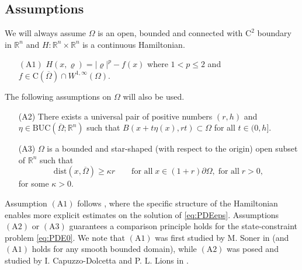 \documentclass[11pt,reqno]{amsart}
\numberwithin{figure}{section}
\theoremstyle{plain}
\theoremstyle{remark}
\numberwithin{equation}{section}
\begin{document}
\subsection{Assumptions} We will always assume $\Omega$ is an open, bounded and connected with $\mathrm{C}^2$ boundary in $\mathbb{R}^n$ and $H:\mathbb{R}^n\times \mathbb{R}^n$ is a continuous Hamiltonian. 
\begin{itemize}
    \item[$\mathrm{(A1)}$] $H(x,\varrho) = |\varrho|^p - f(x)$ where $1<p\leq 2$ and $f\in \mathrm{C}(\overline{\Omega})\cap W^{1,\infty}(\Omega)$.
\end{itemize}
    The following assumptions on $\Omega$ will also be used.
\begin{itemize}    
    \item[(A2)] There exists a universal pair of positive numbers $(r,h)$ and $\eta\in \mathrm{BUC}(\overline{\Omega};\mathbb{R}^n)$ such that $B(x+t\eta(x), rt)\subset\Omega$ for all $t\in (0,h]$.
    \item[(A3)] $\Omega$ is a bounded and star-shaped (with respect to the origin) open subset of $\mathbb{R}^n$ such that
    \begin{equation*}
        \mathrm{dist}(x,\overline{\Omega}) \geq \kappa r \qquad\text{for all}\; x\in (1+r) \partial\Omega, \;\text{for all}\;r>0,
    \end{equation*}
for some $\kappa > 0$.
\end{itemize}
Assumption $\mathrm{(A1)}$ follows \cite{Lasry1989}, where the specific structure of the Hamiltonian enables more explicit estimates on the solution of \eqref{eq:PDEeps}. Assumptions $\mathrm{(A2)}$ or $\mathrm{(A3)}$ guarantees a comparison principle holds for the state-constraint problem \eqref{eq:PDE0}. We note that $\mathrm{(A1)}$ was first studied by M. Soner in \cite{Soner1986} (and $\mathrm{(A1)}$ holds for any smooth bounded domain), while $\mathrm{(A2)}$ was posed and studied by I. Capuzzo-Dolcetta and P. L. Lions in \cite{Capuzzo-Dolcetta1990}. 
\end{document}
